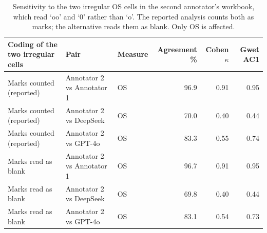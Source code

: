 \begin{table}[t]
\centering
\small
\caption{Sensitivity to the two irregular OS cells in the second annotator's workbook, which read `oo' and `0' rather than `o'. The reported analysis counts both as marks; the alternative reads them as blank. Only OS is affected.}
\label{tab:human_coding_sensitivity}
\begin{tabular}{lllrrr}
\toprule
Coding of the two irregular cells & Pair & Measure & Agreement \% & Cohen $\kappa$ & Gwet AC1 \\
\midrule
Marks counted (reported) & Annotator 2 vs Annotator 1 & OS & 96.9 & 0.91 & 0.95 \\
Marks counted (reported) & Annotator 2 vs DeepSeek & OS & 70.0 & 0.40 & 0.44 \\
Marks counted (reported) & Annotator 2 vs GPT-4o & OS & 83.3 & 0.55 & 0.74 \\
Marks read as blank & Annotator 2 vs Annotator 1 & OS & 96.7 & 0.91 & 0.95 \\
Marks read as blank & Annotator 2 vs DeepSeek & OS & 69.8 & 0.40 & 0.44 \\
Marks read as blank & Annotator 2 vs GPT-4o & OS & 83.1 & 0.54 & 0.73 \\
\bottomrule
\end{tabular}
\end{table}
